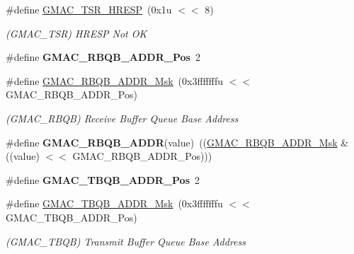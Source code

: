 \begin{DoxyCompactItemize}
\mbox{\label{group__SAME70__GMAC_ga2d992e2aecf172a1b36467e808cf3aba}} 
\#define \mbox{\hyperlink{group__SAME70__GMAC_ga2d992e2aecf172a1b36467e808cf3aba}{G\+M\+A\+C\+\_\+\+T\+S\+R\+\_\+\+H\+R\+E\+SP}}~(0x1u $<$$<$ 8)
\begin{DoxyCompactList}\small\item\em (G\+M\+A\+C\+\_\+\+T\+SR) H\+R\+E\+SP Not OK \end{DoxyCompactList}\item 
\mbox{\label{group__SAME70__GMAC_ga206b5d503189817391330bbed9c6a794}} 
\#define {\bfseries G\+M\+A\+C\+\_\+\+R\+B\+Q\+B\+\_\+\+A\+D\+D\+R\+\_\+\+Pos}~2
\item 
\mbox{\label{group__SAME70__GMAC_gac4d78e750c606111a7d0589d1d1c73ce}} 
\#define \mbox{\hyperlink{group__SAME70__GMAC_gac4d78e750c606111a7d0589d1d1c73ce}{G\+M\+A\+C\+\_\+\+R\+B\+Q\+B\+\_\+\+A\+D\+D\+R\+\_\+\+Msk}}~(0x3fffffffu $<$$<$ G\+M\+A\+C\+\_\+\+R\+B\+Q\+B\+\_\+\+A\+D\+D\+R\+\_\+\+Pos)
\begin{DoxyCompactList}\small\item\em (G\+M\+A\+C\+\_\+\+R\+B\+QB) Receive Buffer Queue Base Address \end{DoxyCompactList}\item 
\mbox{\label{group__SAME70__GMAC_ga5f6df78438a5b0f7f1386bb2060d1d81}} 
\#define {\bfseries G\+M\+A\+C\+\_\+\+R\+B\+Q\+B\+\_\+\+A\+D\+DR}(value)~((\mbox{\hyperlink{group__SAMV71__GMAC_gac4d78e750c606111a7d0589d1d1c73ce}{G\+M\+A\+C\+\_\+\+R\+B\+Q\+B\+\_\+\+A\+D\+D\+R\+\_\+\+Msk}} \& ((value) $<$$<$ G\+M\+A\+C\+\_\+\+R\+B\+Q\+B\+\_\+\+A\+D\+D\+R\+\_\+\+Pos)))
\item 
\mbox{\label{group__SAME70__GMAC_ga4f2b7530a5633413c9095bd0aa695d87}} 
\#define {\bfseries G\+M\+A\+C\+\_\+\+T\+B\+Q\+B\+\_\+\+A\+D\+D\+R\+\_\+\+Pos}~2
\item 
\mbox{\label{group__SAME70__GMAC_gaf89359a485905c67a16b25227df29edc}} 
\#define \mbox{\hyperlink{group__SAME70__GMAC_gaf89359a485905c67a16b25227df29edc}{G\+M\+A\+C\+\_\+\+T\+B\+Q\+B\+\_\+\+A\+D\+D\+R\+\_\+\+Msk}}~(0x3fffffffu $<$$<$ G\+M\+A\+C\+\_\+\+T\+B\+Q\+B\+\_\+\+A\+D\+D\+R\+\_\+\+Pos)
\begin{DoxyCompactList}\small\item\em (G\+M\+A\+C\+\_\+\+T\+B\+QB) Transmit Buffer Queue Base Address \end{DoxyCompactList}\item 

\end{DoxyCompactItemize}
